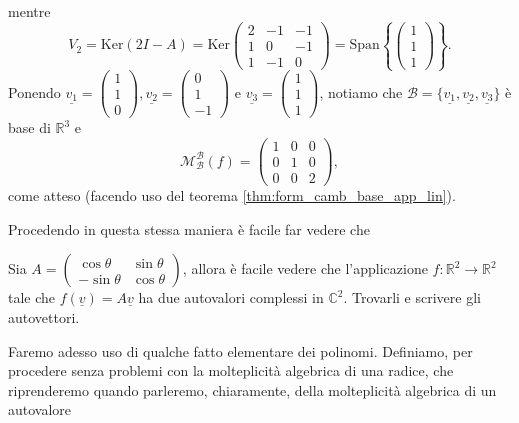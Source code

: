 \begin{example}
$$    $$
    mentre
    $$
        V_2 = \text{Ker}(2I - A) = \text{Ker} \begin{pmatrix} 2 & -1 & -1 \\ 1 & 0 & -1 \\ 1 & -1 & 0 \end{pmatrix} = \text{Span} \left\{ \begin{pmatrix} 1 \\ 1 \\ 1 \end{pmatrix} \right\}.
    $$
    Ponendo $\underline{v_1} = \begin{pmatrix} 1 \\ 1 \\ 0 \end{pmatrix}, \underline{v_2} = \begin{pmatrix} 0 \\ 1 \\ -1 \end{pmatrix}$ e $\underline{v_3} = \begin{pmatrix} 1 \\ 1 \\ 1 \end{pmatrix}$, notiamo che $\mathcal{B} = \{ \underline{v_1}, \underline{v_2}, \underline{v_3} \}$ è base di $\mathbb{R}^3$ e
    $$
        \mathcal{M}^\mathcal{B}_\mathcal{B}(f) = \begin{pmatrix}
            1 & 0 & 0 \\
            0 & 1 & 0 \\
            0 & 0 & 2
        \end{pmatrix},
    $$
    come atteso (facendo uso del teorema \ref{thm:form_camb_base_app_lin}).
\end{example}
Procedendo in questa stessa maniera è facile far vedere che
\begin{exercise}
    Sia $A = \begin{pmatrix} \cos{\theta} & \sin{\theta} \\ -\sin{\theta} & \cos{\theta} \end{pmatrix}$, allora è facile vedere che l'applicazione $f: \mathbb{R}^2 \to \mathbb{R}^2$ tale che $f(\underline{v}) = A\underline{v}$ ha due autovalori complessi in $\mathbb{C}^2$. Trovarli e scrivere gli autovettori.
\end{exercise}

Faremo adesso uso di qualche fatto elementare dei polinomi. Definiamo, per procedere senza problemi con la molteplicità algebrica di una radice, che riprenderemo quando parleremo, chiaramente, della molteplicità algebrica di un autovalore

